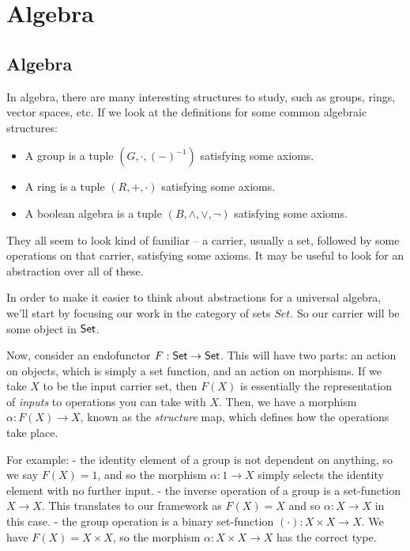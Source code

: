 
\chapter{Algebra}

\section{Algebra}

In algebra, there are many interesting structures to study, such as groups, rings, vector spaces, etc.
If we look at the definitions for some common algebraic structures:

\begin{itemize}
    \item A group is a tuple $(G, \cdot, (-)^{-1})$ satisfying some axioms.
    \item A ring is a tuple $(R, +, \cdot)$ satisfying some axioms.
    \item A boolean algebra is a tuple $(B, \wedge, \vee, \neg)$ satisfying some axioms.
\end{itemize}

They all seem to look kind of familiar -- a carrier, usually a set, followed by some operations on that carrier, satisfying some axioms.
It may be useful to look for an abstraction over all of these.

In order to make it easier to think about abstractions for a universal algebra, we'll start by focusing our work in the category of sets $Set$.
So our carrier will be some object in $\mathsf{Set}$.

Now, consider an endofunctor $F : \mathsf{Set} \rightarrow \mathsf{Set}$.
This will have two parts: an action on objects, which is simply a set function, and an action on morphisms.
If we take $X$ to be the input carrier set, then $F(X)$ is essentially the representation of \emph{inputs} to operations you can take with $X$.
Then, we have a morphism $\alpha : F(X) \rightarrow X$, known as the \emph{structure} map, which defines how the operations take place.

For example:
- the identity element of a group is not dependent on anything, so we say $F(X) = 1$, and so the morphism $\alpha : 1 \rightarrow X$ simply selects the identity element with no further input.
- the inverse operation of a group is a set-function $X \rightarrow X$. This translates to our framework as $F(X) = X$ and so $\alpha : X \rightarrow X$ in this case.
- the group operation is a binary set-function $(\cdot) : X \times X \rightarrow X$. We have $F(X) = X \times X$, so the morphism $\alpha : X \times X \rightarrow X$ has the correct type.

